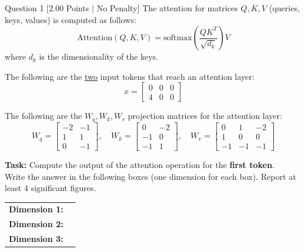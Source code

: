 \documentclass[11pt,a4paper]{article}
\begin{document}
\begin{questionbox}{Question 1 \hfill [2.00 Points $\vert$ No Penalty]}
The attention for matrices $Q, K, V$ (queries, keys, values) is computed as follows:
\begin{equation*}
    \text{Attention}(Q, K, V) = \text{softmax}\left(\frac{QK^T}{\sqrt{d_k}}\right)V
\end{equation*}
where $d_k$ is the dimensionality of the keys.

The following are the \underline{two} input tokens that reach an attention layer:
\begin{equation*}
    x = \begin{bmatrix}
        0 & 0 & 0 \\
        4 & 0 & 0
    \end{bmatrix}
\end{equation*}

The following are the $W_q, W_k, W_v$ projection matrices for the attention layer:
\begin{equation*}
    W_q = \begin{bmatrix}
        -2 & -1 \\
        1 & 1 \\
        0 & -1
    \end{bmatrix}, \quad
    W_k = \begin{bmatrix}
        0 & -2 \\
        -1 & 0 \\
        -1 & 1
    \end{bmatrix}, \quad
    W_v = \begin{bmatrix}
        0 & 1 & -2 \\
        1 & 0 & 0 \\
        -1 & -1 & -1
    \end{bmatrix}
\end{equation*}

\medskip
\noindent
\textbf{Task:} Compute the output of the attention operation for the \textbf{first token}.\\
Write the answer in the following boxes (one dimension for each box). Report at least 4 significant figures.

\medskip
\begin{tabular}{ll}
\textbf{Dimension 1:} & \underline{\hspace{4cm}} \\
\textbf{Dimension 2:} & \underline{\hspace{4cm}} \\
\textbf{Dimension 3:} & \underline{\hspace{4cm}} \\
\end{tabular}
\end{questionbox}
\end{document}
